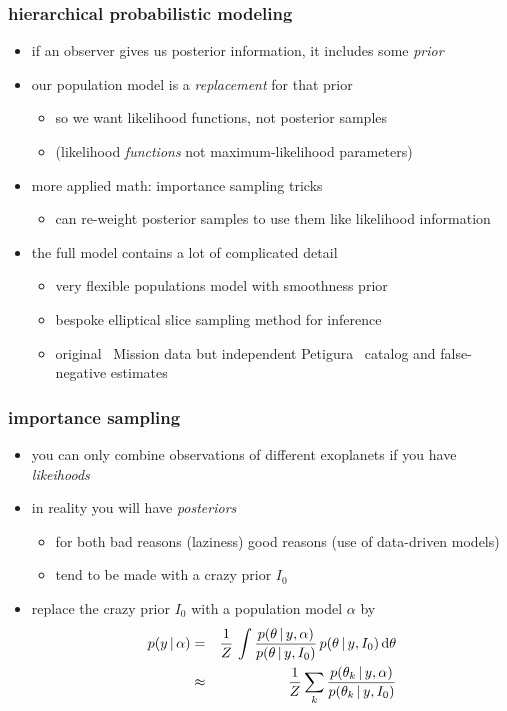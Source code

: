 \documentclass[pdftex]{beamer}
\begin{document}
\begin{frame}
  \frametitle{hierarchical probabilistic modeling}
  \begin{itemize}
  \item if an observer gives us posterior information, it includes some \emph{prior}
  \item our population model is a \emph{replacement} for that prior
    \begin{itemize}
    \item so we want likelihood functions, not posterior samples
    \item (likelihood \emph{functions} not maximum-likelihood parameters)
    \end{itemize}
  \item more applied math: importance sampling tricks
    \begin{itemize}
    \item can re-weight posterior samples to use them like likelihood information
    \end{itemize}
  \item the full model contains a lot of complicated detail
    \begin{itemize}
    \item very flexible populations model with smoothness prior
    \item bespoke elliptical slice sampling method for inference
    \item original \kepler\ Mission data but independent Petigura \etal\ catalog and false-negative estimates
    \end{itemize}
  \end{itemize}
\end{frame}

\begin{frame}
  \frametitle{importance sampling}
  \begin{itemize}
  \item you can only combine observations of different exoplanets if you have \emph{likeihoods}
  \item in reality you will have \emph{posteriors}
    \begin{itemize}
    \item for both bad reasons (laziness) good reasons (use of data-driven models)
    \item tend to be made with a crazy prior $I_0$
    \end{itemize}
  \item replace the crazy prior $I_0$ with a population model $\alpha$ by
    \begin{eqnarray}
      p(y\,|\, \alpha) &=& \frac{1}{Z}\,\int \frac{p(\theta\,|\, y,\alpha)}{p(\theta\,|\, y,I_0)}\,p(\theta\,|\, y,I_0)\,\mathrm{d}\theta
      \\
      &\approx& \frac{1}{Z}\sum_k \frac{p(\theta_k\,|\, y,\alpha)}{p(\theta_k\,|\, y,I_0)}
    \end{eqnarray}
  \end{itemize}
\end{frame}
\end{document}

